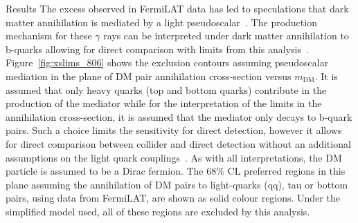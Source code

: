 \begin{section}{Results}
The excess observed in FermiLAT data has led to speculations that dark matter annihilation is mediated by a light pseudoscalar~\cite{Calore:2014nla}. 
The production mechanism for these $\gamma$ rays can be interpreted under dark matter annihilation to b-quarks allowing for direct 
comparison with limits from this analysis~\cite{Buchmueller:2015eea,Buckley:2014fba,Harris:2014hga}. Figure~\ref{fig:xslims_806} shows 
the exclusion contours assuming pseudoscalar mediation in the plane of DM pair annihilation cross-section versus $m_{\textrm{DM}}$. 
It is assumed that only heavy quarks (top and bottom quarks) contribute in the production of the mediator while for  
the interpretation of the limits in the annihilation cross-section, it is assumed that the mediator only decays to b-quark pairs. 
Such a choice limits the sensitivity for direct 
detection, however it allows for direct comparison between collider and direct detection without an additional assumptions 
on the light quark couplings~\cite{Harris:2015kda}. As with all interpretations, the DM particle is assumed to be a Dirac fermion.
The 68\% CL preferred regions in this plane assuming the annihilation of DM pairs to light-quarks (qq), tau or bottom pairs, using data from FermiLAT, 
are shown as solid colour regions. Under the simplified model used, all of these regions are excluded by this analysis.



\end{section}
